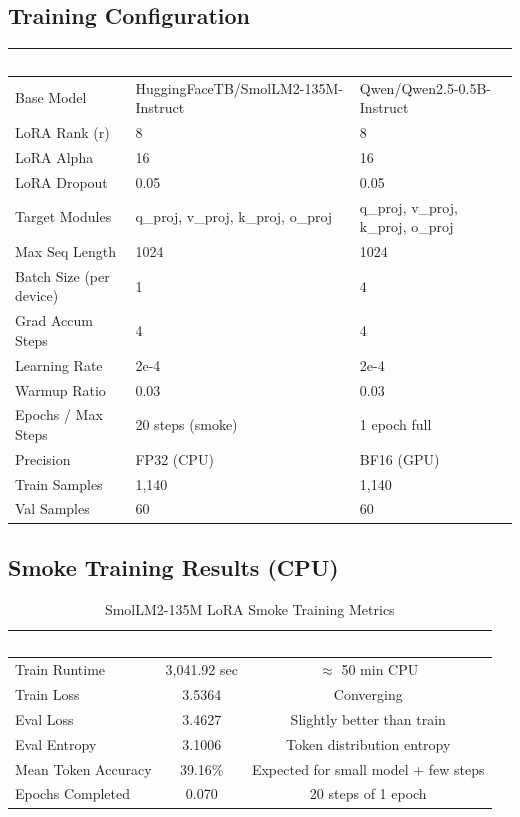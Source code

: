 \documentclass[11pt,a4paper]{article}
\begin{document}
\subsection{Training Configuration}
\begin{nvidiabox}
\begin{tabular}{>{\color{nvidiaText}}l >{\color{nvidiaText}}l >{\color{nvidiaText}}l}
\rowcolor{tableHeader}
\textcolor{white}{\textbf{Parameter}} & \textcolor{white}{\textbf{Smoke (CPU)}} & \textcolor{white}{\textbf{GPU Target}} \\
\midrule
Base Model & HuggingFaceTB/SmolLM2-135M-Instruct & Qwen/Qwen2.5-0.5B-Instruct \\
LoRA Rank (r) & 8 & 8 \\
LoRA Alpha & 16 & 16 \\
LoRA Dropout & 0.05 & 0.05 \\
Target Modules & q\_proj, v\_proj, k\_proj, o\_proj & q\_proj, v\_proj, k\_proj, o\_proj \\
Max Seq Length & 1024 & 1024 \\
Batch Size (per device) & 1 & 4 \\
Grad Accum Steps & 4 & 4 \\
Learning Rate & 2e-4 & 2e-4 \\
Warmup Ratio & 0.03 & 0.03 \\
Epochs / Max Steps & 20 steps (smoke) & 1 epoch full \\
Precision & FP32 (CPU) & BF16 (GPU) \\
Train Samples & 1,140 & 1,140 \\
Val Samples & 60 & 60 \\
\bottomrule
\end{tabular}
\end{nvidiabox}

\subsection{Smoke Training Results (CPU)}
\begin{table}[H]
\centering
\caption{SmolLM2-135M LoRA Smoke Training Metrics}
\label{tab:smoke_training}
\begin{tabular}{>{\color{nvidiaText}}l >{\color{nvidiaText}}c >{\color{nvidiaText}}c}
\rowcolor{tableHeader}
\textcolor{white}{\textbf{Metric}} & \textcolor{white}{\textbf{Value}} & \textcolor{white}{\textbf{Interpretation}} \\
\midrule
Train Runtime & 3,041.92 sec & $\approx$ 50 min CPU \\
Train Loss & 3.5364 & Converging \\
Eval Loss & 3.4627 & Slightly better than train \\
Eval Entropy & 3.1006 & Token distribution entropy \\
Mean Token Accuracy & 39.16\% & Expected for small model + few steps \\
Epochs Completed & 0.070 & 20 steps of 1 epoch \\
\bottomrule
\end{tabular}
\end{table}
\end{document}
